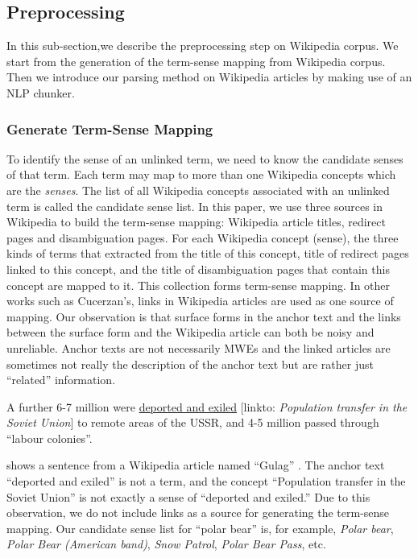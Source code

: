 \subsection{Preprocessing}
In this sub-section,we describe the preprocessing step
on Wikipedia corpus.
We start from the generation
of the term-sense mapping from Wikipedia corpus.
Then we introduce our parsing method on
Wikipedia articles by making use of an NLP chunker.

\subsubsection{Generate Term-Sense Mapping}
To identify the sense of an unlinked term, we need to know the candidate
senses of that term.
Each term may map to more than
one Wikipedia concepts which are the {\em senses}.
The list of all Wikipedia concepts associated with an unlinked term is called
the candidate sense list.
In this paper, we use three sources in Wikipedia to build the
term-sense mapping:
Wikipedia article titles, redirect pages and disambiguation pages.
For each Wikipedia concept (sense), the three kinds of terms that extracted from
the title of this concept,
title of redirect pages linked to this concept,
and the title of disambiguation pages that contain this concept are mapped to it.
This collection forms term-sense mapping.
In other works such as Cucerzan's\cite{cucerzan2007large},
links in Wikipedia articles are used as one source of mapping.
Our observation is that surface forms in the anchor text and the links
between the surface form and the Wikipedia article can both be
noisy and unreliable. Anchor texts are not necessarily MWEs
and the linked articles are sometimes not really the description of
the anchor text but are rather just ``related'' information.

\myskip
\begin{example}
\label{ex:wronglink}
A further 6-7 million were {\color{blue}\uline{deported and exiled}}
 [linkto: {\em Population transfer in the Soviet Union}] to remote areas of
the USSR, and 4-5 million passed through ``labour colonies''.
\end{example}
\myskip

 shows a sentence from a Wikipedia article
named ``Gulag'' \cite{gulag}.
The anchor text ``deported and exiled'' is not a term, and the
concept  ``Population transfer in the Soviet Union'' is not exactly
a sense of ``deported and exiled.''
Due to this observation, we do not include links as a source for
generating the term-sense mapping.
Our candidate sense list for ``polar bear'' is, for example,
{\em Polar bear}, {\em Polar Bear (American band)}, {\em Snow Patrol},
{\em Polar Bear Pass}, etc.



